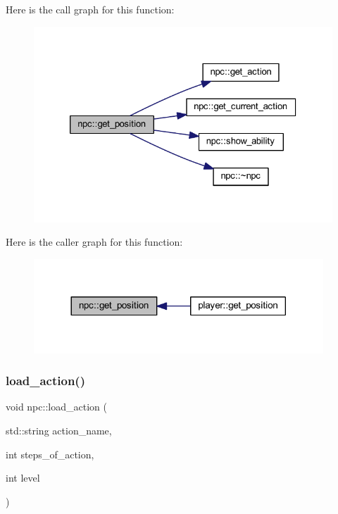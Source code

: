 Here is the call graph for this function\+:
\nopagebreak
\begin{figure}[H]
\begin{center}
\leavevmode
\includegraphics[width=326pt]{classnpc_af58658444d25eaa77aec883dd9d5592d_cgraph}
\end{center}
\end{figure}
Here is the caller graph for this function\+:
\nopagebreak
\begin{figure}[H]
\begin{center}
\leavevmode
\includegraphics[width=308pt]{classnpc_af58658444d25eaa77aec883dd9d5592d_icgraph}
\end{center}
\end{figure}
\mbox{\label{classnpc_a3f32867195150317774af508034f0a41}} 
\subsubsection{\texorpdfstring{load\+\_\+action()}{load\_action()}}
{\footnotesize\ttfamily void npc\+::load\+\_\+action (\begin{DoxyParamCaption}\item[{std\+::string}]{action\+\_\+name,  }\item[{int}]{steps\+\_\+of\+\_\+action,  }\item[{int}]{level }\end{DoxyParamCaption})\hspace{0.3cm}{\ttfamily [private]}}



